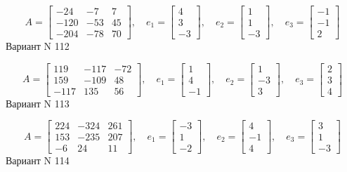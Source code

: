 \documentclass[11pt]{report}
\begin{document}
$$A = \left[\begin{matrix}-24 & -7 & 7\\-120 & -53 & 45\\-204 & -78 & 70\end{matrix}\right],\quad e_1 = \left[\begin{matrix}4\\3\\-3\end{matrix}\right],\quad e_2 = \left[\begin{matrix}1\\1\\-3\end{matrix}\right],\quad e_3 = \left[\begin{matrix}-1\\-1\\2\end{matrix}\right]$$Вариант N 112

$$A = \left[\begin{matrix}119 & -117 & -72\\159 & -109 & 48\\-117 & 135 & 56\end{matrix}\right],\quad e_1 = \left[\begin{matrix}1\\4\\-1\end{matrix}\right],\quad e_2 = \left[\begin{matrix}1\\-3\\3\end{matrix}\right],\quad e_3 = \left[\begin{matrix}2\\3\\4\end{matrix}\right]$$Вариант N 113

$$A = \left[\begin{matrix}224 & -324 & 261\\153 & -235 & 207\\-6 & 24 & 11\end{matrix}\right],\quad e_1 = \left[\begin{matrix}-3\\1\\-2\end{matrix}\right],\quad e_2 = \left[\begin{matrix}4\\-1\\4\end{matrix}\right],\quad e_3 = \left[\begin{matrix}3\\1\\-3\end{matrix}\right]$$Вариант N 114
\end{document}
